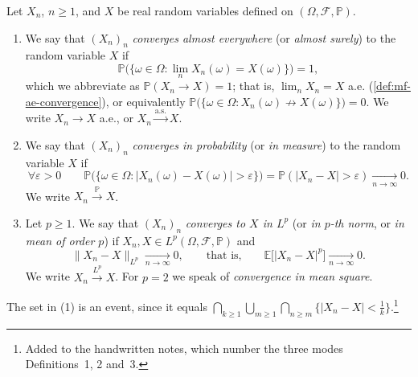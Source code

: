 \begin{definition}\label{def:ll-convergence}
Let $X_n$, $n\ge1$, and $X$ be real random variables defined on $(\Omega,\mathcal F,\mathbb P)$.
\begin{enumerate}[label=(\arabic*)]
  \item We say that $(X_n)_n$ \emph{converges almost everywhere} (or \emph{almost surely}) to the
    random variable $X$ if
    \[
      \mathbb P\big(\{\omega\in\Omega:\lim_nX_n(\omega)=X(\omega)\}\big)=1,
    \]
    which we abbreviate as $\mathbb P(X_n\to X)=1$; that is, $\lim_nX_n=X$ a.e.
    (\cref{def:mf-ae-convergence}), or equivalently
    $\mathbb P\big(\{\omega\in\Omega:X_n(\omega)\not\to X(\omega)\}\big)=0$. We write
    $X_n\to X$ a.e., or $X_n\xrightarrow{\text{a.s.}}X$.
  \item We say that $(X_n)_n$ \emph{converges in probability} (or \emph{in measure}) to the random
    variable $X$ if
    \[
      \forall\varepsilon>0\qquad
      \mathbb P\big(\{\omega\in\Omega:|X_n(\omega)-X(\omega)|>\varepsilon\}\big)
      =\mathbb P(|X_n-X|>\varepsilon)\xrightarrow[n\to\infty]{}0 .
    \]
    We write $X_n\xrightarrow{\mathbb P}X$.
  \item Let $p\ge1$. We say that $(X_n)_n$ \emph{converges to $X$ in $L^p$} (or \emph{in $p$-th
    norm}, or \emph{in mean of order $p$}) if $X_n,X\in L^p(\Omega,\mathcal F,\mathbb P)$ and
    \[
      \|X_n-X\|_{L^p}\xrightarrow[n\to\infty]{}0,\qquad\text{that is,}\qquad
      \mathbb E\big[|X_n-X|^p\big]\xrightarrow[n\to\infty]{}0 .
    \]
    We write $X_n\xrightarrow{L^p}X$. For $p=2$ we speak of \emph{convergence in mean square}.
\end{enumerate}
\end{definition}

The set in (1) is an event, since it equals
$\bigcap_{k\ge1}\bigcup_{m\ge1}\bigcap_{n\ge m}\{|X_n-X|<\frac1k\}$.\footnote{Added to the
handwritten notes, which number the three modes Definitions~1, 2 and~3.}

